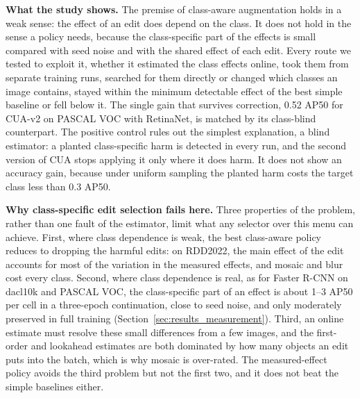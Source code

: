 \documentclass[conference]{IEEEtran}
\begin{document}
\noindent\textbf{What the study shows.} The premise of class-aware augmentation holds in a weak sense: the effect of an edit does depend on the class. It does not hold in the sense a policy needs, because the class-specific part of the effects is small compared with seed noise and with the shared effect of each edit. Every route we tested to exploit it, whether it estimated the class effects online, took them from separate training runs, searched for them directly or changed which classes an image contains, stayed within the minimum detectable effect of the best simple baseline or fell below it. The single gain that survives correction, 0.52 AP50 for CUA-v2 on PASCAL VOC with RetinaNet, is matched by its class-blind counterpart. The positive control rules out the simplest explanation, a blind estimator: a planted class-specific harm is detected in every run, and the second version of CUA stops applying it only where it does harm. It does not show an accuracy gain, because under uniform sampling the planted harm costs the target class less than 0.3 AP50.

\noindent\textbf{Why class-specific edit selection fails here.} Three properties of the problem, rather than one fault of the estimator, limit what any selector over this menu can achieve. First, where class dependence is weak, the best class-aware policy reduces to dropping the harmful edits: on RDD2022, the main effect of the edit accounts for most of the variation in the measured effects, and mosaic and blur cost every class. Second, where class dependence is real, as for Faster R-CNN on dacl10k and PASCAL VOC, the class-specific part of an effect is about 1--3 AP50 per cell in a three-epoch continuation, close to seed noise, and only moderately preserved in full training (Section~\ref{sec:results_measurement}). Third, an online estimate must resolve these small differences from a few images, and the first-order and lookahead estimates are both dominated by how many objects an edit puts into the batch, which is why mosaic is over-rated. The measured-effect policy avoids the third problem but not the first two, and it does not beat the simple baselines either.
\end{document}
